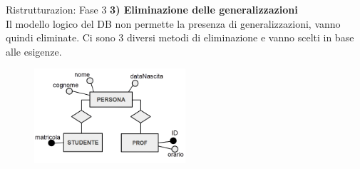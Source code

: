 %
\begin{frame}{Ristrutturazion: Fase 3}
\textbf{3) Eliminazione delle generalizzazioni}
\\\vspace{2em}
Il modello logico del DB non permette la presenza di generalizzazioni, vanno quindi eliminate. Ci sono 3 diversi metodi di eliminazione e vanno scelti in base alle esigenze.
\begin{figure}[h]
        \centering
        \includegraphics[width=0.5\textwidth]{img/i6.png}
    \end{figure}
\end{frame}
%
